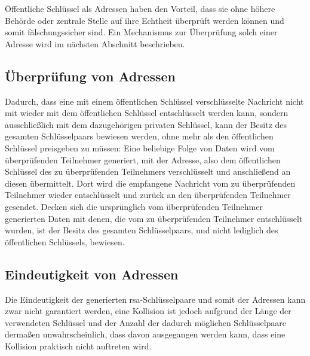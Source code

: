 Öffentliche Schlüssel als Adressen haben den Vorteil, dass sie ohne höhere Behörde oder zentrale Stelle
auf ihre Echtheit überprüft werden können und somit fälschungssicher sind. Ein Mechanismus zur
Überprüfung solch einer Adresse wird im nächsten Abschnitt beschrieben.

\subsection{Überprüfung von Adressen}
Dadurch, dass eine mit einem öffentlichen Schlüssel verschlüsselte Nachricht nicht mit wieder mit dem
öffentlichen Schlüssel entschlüsselt werden kann, sondern ausschließlich mit dem dazugehörigen privaten
Schlüssel, kann der Besitz des gesamten Schlüsselpaars bewiesen werden, ohne mehr als den öffentlichen
Schlüssel preisgeben zu müssen: Eine beliebige Folge von Daten wird vom überprüfenden Teilnehmer
generiert, mit der Adresse, also dem öffentlichen Schlüssel des zu überprüfenden Teilnehmers
verschlüsselt und anschließend an diesen übermittelt. Dort wird die empfangene Nachricht vom zu
überprüfenden Teilnehmer wieder entschlüsselt und zurück an den überprüfenden Teilnehmer gesendet.
Decken sich die ursprünglich vom überprüfenden Teilnehmer generierten Daten mit denen, die vom zu
überprüfenden Teilnehmer entschlüsselt wurden, ist der Besitz des gesamten Schlüsselpaars, und nicht
lediglich des öffentlichen Schlüssels, bewiesen.



\subsection{Eindeutigkeit von Adressen}
Die Eindeutigkeit der generierten \gls{rsa}-Schlüsselpaare und somit der Adressen kann zwar nicht
garantiert werden, eine Kollision ist jedoch aufgrund der Länge der verwendeten Schlüssel und der
Anzahl der dadurch möglichen Schlüsselpaare dermaßen unwahrscheinlich, dass davon ausgegangen
werden kann, dass eine Kollision praktisch nicht auftreten wird. \cite{crypto.stackexchange.com/a/2559:rsa-key-collision}

